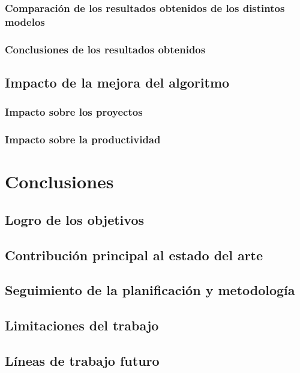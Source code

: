 \documentclass[IB]{TFUOC}
\begin{document}
\subsection{Comparación de los resultados obtenidos de los distintos modelos}

\subsection{Conclusiones de los resultados obtenidos}

\section{Impacto de la mejora del algoritmo}

\subsection{Impacto sobre los proyectos}

\subsection{Impacto sobre la productividad}

\chapter{Conclusiones}

\section{Logro de los objetivos}

\section{Contribución principal al estado del arte}

\section{Seguimiento de la planificación y metodología}

\section{Limitaciones del trabajo}

\section{Líneas de trabajo futuro}
\end{document}
